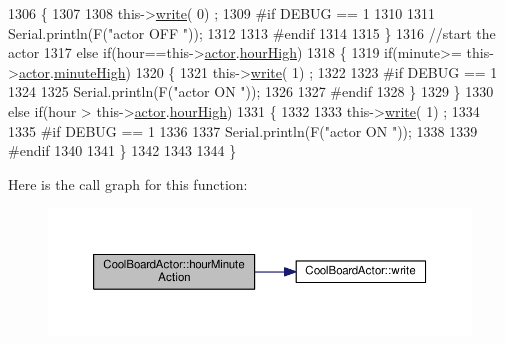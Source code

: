\begin{DoxyCode}
1306     \{
1307 
1308         this->\hyperlink{class_cool_board_actor_a958786ff01ea1056ee72c72d439f86da}{write}( 0) ;
1309 \textcolor{preprocessor}{    #if DEBUG == 1 }
1310 
1311         Serial.println(F(\textcolor{stringliteral}{"actor OFF "}));
1312 
1313 \textcolor{preprocessor}{    #endif  }
1314     
1315     \}
1316     \textcolor{comment}{//start the actor}
1317     \textcolor{keywordflow}{else} \textcolor{keywordflow}{if}(hour==this->\hyperlink{class_cool_board_actor_a8f190db9f7a39fddbcef7f152da970e9}{actor}.\hyperlink{struct_cool_board_actor_1_1state_acd1af3ac2382258a5b05497d814adc01}{hourHigh})
1318     \{
1319         \textcolor{keywordflow}{if}(minute>= this->\hyperlink{class_cool_board_actor_a8f190db9f7a39fddbcef7f152da970e9}{actor}.\hyperlink{struct_cool_board_actor_1_1state_a4bff3d61ead74adb60be224764b93006}{minuteHigh})
1320         \{
1321             this->\hyperlink{class_cool_board_actor_a958786ff01ea1056ee72c72d439f86da}{write}( 1) ;
1322 
1323 \textcolor{preprocessor}{        #if DEBUG == 1 }
1324 
1325             Serial.println(F(\textcolor{stringliteral}{"actor ON "}));
1326 
1327 \textcolor{preprocessor}{        #endif  }
1328         \}
1329     \}
1330     \textcolor{keywordflow}{else} \textcolor{keywordflow}{if}(hour > this->\hyperlink{class_cool_board_actor_a8f190db9f7a39fddbcef7f152da970e9}{actor}.\hyperlink{struct_cool_board_actor_1_1state_acd1af3ac2382258a5b05497d814adc01}{hourHigh})
1331     \{
1332 
1333         this->\hyperlink{class_cool_board_actor_a958786ff01ea1056ee72c72d439f86da}{write}( 1) ;
1334 
1335 \textcolor{preprocessor}{    #if DEBUG == 1 }
1336 
1337         Serial.println(F(\textcolor{stringliteral}{"actor ON "}));
1338 
1339 \textcolor{preprocessor}{    #endif      }
1340 
1341     \}
1342 
1343     
1344 \}
\end{DoxyCode}
Here is the call graph for this function\+:\nopagebreak
\begin{figure}[H]
\begin{center}
\leavevmode
\includegraphics[width=350pt]{dc/d69/class_cool_board_actor_a1eb1fbca19bc80aad20d2686d52317f8_cgraph}
\end{center}
\end{figure}

